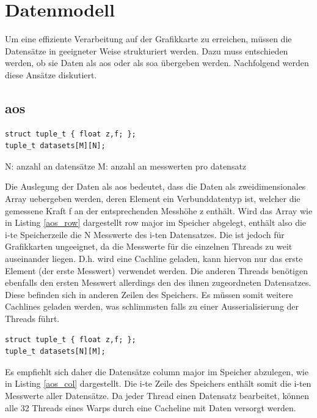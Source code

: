 \section{Datenmodell}
Um eine effiziente Verarbeitung auf der Grafikkarte zu erreichen, müssen die Datensätze in geeigneter Weise strukturiert werden.
Dazu muss entschieden werden, ob sie Daten als \gls{aos} oder als \gls{soa} übergeben werden. Nachfolgend werden diese Ansätze diskutiert.

\subsection{\acrlong{aos}}
\begin{lstlisting}[label=aos_row,caption=\gls{aos} row major]
struct tuple_t { float z,f; };
tuple_t datasets[M][N];
\end{lstlisting}

N: anzahl an datensätze
M: anzahl an messwerten pro datensatz

Die Auslegung der Daten als \gls{aos} bedeutet, dass die Daten als zweidimensionales Array uebergeben werden, deren Element ein Verbunddatentyp ist, welcher die gemessene Kraft f an der entsprechenden Messhöhe z enthält. Wird das Array wie in Listing \ref{aos_row} dargestellt row major im Speicher abgelegt, enthält also die i-te Speicherzeile die N Messwerte des i-ten Datensatzes.
Die ist jedoch für Grafikkarten ungeeignet, da die Messwerte für die einzelnen Threads zu weit auseinander liegen. D.h. wird eine Cachline geladen, kann hiervon nur das erste Element (der erste Messwert) verwendet werden. Die anderen Threads benötigen ebenfalls den ersten Messwert allerdings den des ihnen zugeordneten Datensatzes. Diese befinden sich in anderen Zeilen des Speichers.
Es müssen somit weitere Cachlines geladen werden, was schlimmsten falls zu einer Ausserialisierung der Threads führt.


\begin{lstlisting}[label=aos_col,caption=\gls{aos} column major]
struct tuple_t { float z,f; };
tuple_t datasets[N][M];
\end{lstlisting}

Es empfiehlt sich daher die Datensätze column major im Speicher abzulegen, wie in Listing \ref{aos_col} dargestellt. Die i-te Zeile des Speichers enthält somit die i-ten Messwerte aller Datensätze. Da jeder Thread einen Datensatz bearbeitet, können alle 32 Threads eines Warps durch eine Cacheline mit Daten versorgt werden.


